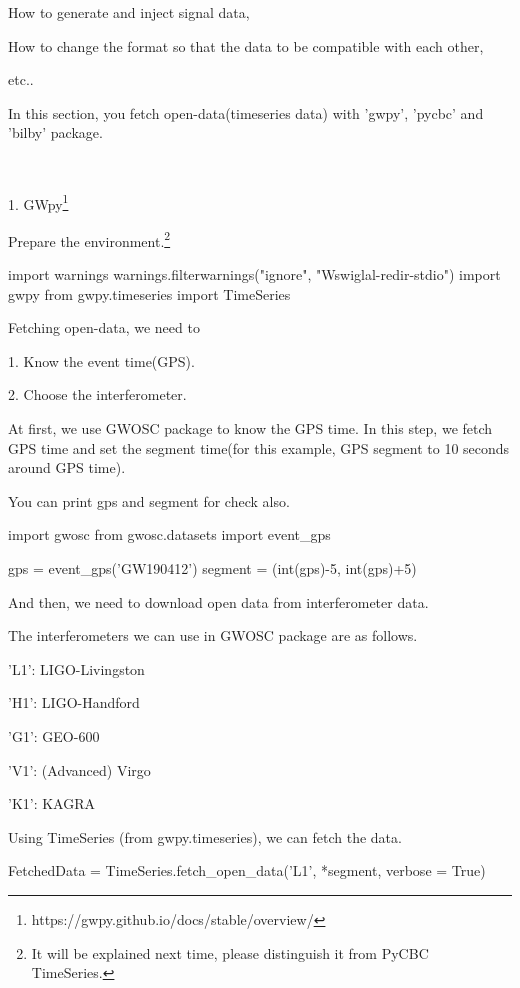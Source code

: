How to generate and inject signal data,

How to change the format so that the data to be compatible with each other,

etc..

In this section, you fetch open-data(timeseries data) with 'gwpy', 'pycbc' and 'bilby' package.

\

1. GWpy\footnote{https://gwpy.github.io/docs/stable/overview/}

Prepare the environment.\footnote{It will be explained next time, please distinguish it from PyCBC TimeSeries.}

\begin{python}[Python3]
import warnings
warnings.filterwarnings("ignore", "Wswiglal-redir-stdio")
import gwpy
from gwpy.timeseries import TimeSeries
\end{python}

Fetching open-data, we need to

1. Know the event time(GPS).

2. Choose the interferometer.

At first, we use GWOSC package to know the GPS time. In this step, we fetch GPS time and set the segment time(for this example, GPS segment to 10 seconds around GPS time).

You can print gps and segment for check also.

\begin{python}[python3]
import gwosc
from gwosc.datasets import event_gps

gps = event_gps('GW190412')
segment = (int(gps)-5, int(gps)+5)
\end{python}

And then, we need to download open data from interferometer data.

The interferometers we can use in GWOSC package are as follows.

'L1': LIGO-Livingston

'H1': LIGO-Handford

'G1': GEO-600

'V1': (Advanced) Virgo

'K1': KAGRA

Using TimeSeries (from gwpy.timeseries), we can fetch the data.

\begin{python}[python3]
    FetchedData = TimeSeries.fetch_open_data('L1', *segment, verbose = True)
\end{python}

